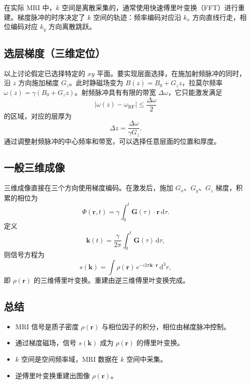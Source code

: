 \documentclass[12pt,a4paper]{article}
\begin{document}
	在实际 MRI 中，$k$ 空间是离散采集的，通常使用快速傅里叶变换（FFT）进行重建。梯度脉冲的时序决定了 $k$ 空间的轨迹：频率编码对应沿 $k_x$ 方向直线行走，相位编码对应 $k_y$ 方向离散跳跃。
	
	\subsection{选层梯度（三维定位）}
	
	以上讨论假定已选择特定的 $xy$ 平面。要实现层面选择，在施加射频脉冲的同时，沿 $z$ 方向施加梯度 $G_z$。此时静磁场变为 $B(z) = B_0 + G_z z$，拉莫尔频率 $\omega(z) = \gamma(B_0+G_z z)$。射频脉冲具有有限的带宽 $\Delta \omega$，它只能激发满足
	\begin{equation}
		|\omega(z) - \omega_{\text{RF}}| \le \frac{\Delta \omega}{2}
	\end{equation}
	的区域，对应的层厚为
	\begin{equation}
		\Delta z = \frac{\Delta \omega}{\gamma G_z}.
	\end{equation}
	通过调整射频脉冲的中心频率和带宽，可以选择任意层面的位置和厚度。
	
	\subsection{一般三维成像}
	
	三维成像直接在三个方向使用梯度编码。在激发后，施加 $G_x$、$G_y$、$G_z$ 梯度，积累的相位为
	\begin{equation}
		\Phi(\mathbf{r},t) = \gamma \int_0^t \mathbf{G}(\tau)\cdot\mathbf{r} \, \mathrm{d}\tau.
	\end{equation}
	定义
	\begin{equation}
		\mathbf{k}(t) = \frac{\gamma}{2\pi} \int_0^t \mathbf{G}(\tau)\, \mathrm{d}\tau,
	\end{equation}
	则信号方程为
	\begin{equation}
		s(\mathbf{k}) = \int \rho(\mathbf{r}) \, e^{-i 2\pi \mathbf{k}\cdot\mathbf{r}} \, \mathrm{d}^3r,
	\end{equation}
	即 $\rho(\mathbf{r})$ 的三维傅里叶变换。重建由逆三维傅里叶变换完成。
	
	\subsection{总结}
	
	\begin{itemize}
		\item MRI 信号是质子密度 $\rho(\mathbf{r})$ 与相位因子的积分，相位由梯度脉冲控制。
		\item 通过梯度磁场，信号 $s(\mathbf{k})$ 成为 $\rho(\mathbf{r})$ 的傅里叶变换。
		\item $k$ 空间是空间频率域，MRI 数据在 $k$ 空间中采集。
		\item 逆傅里叶变换重建出图像 $\rho(\mathbf{r})$。
	\end{itemize}
\end{document}
